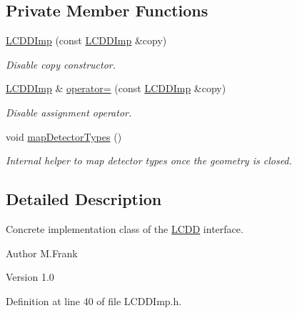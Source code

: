 \subsection*{Private Member Functions}
\begin{DoxyCompactItemize}
\item 
\hyperlink{class_d_d4hep_1_1_geometry_1_1_l_c_d_d_imp_a4c1a7d15bece44b7b5e40e995aecde54}{LCDDImp} (const \hyperlink{class_d_d4hep_1_1_geometry_1_1_l_c_d_d_imp}{LCDDImp} \&copy)
\begin{DoxyCompactList}\small\item\em Disable copy constructor. \item\end{DoxyCompactList}\item 
\hyperlink{class_d_d4hep_1_1_geometry_1_1_l_c_d_d_imp}{LCDDImp} \& \hyperlink{class_d_d4hep_1_1_geometry_1_1_l_c_d_d_imp_a429b6797c934059cab5109ab882f9e81}{operator=} (const \hyperlink{class_d_d4hep_1_1_geometry_1_1_l_c_d_d_imp}{LCDDImp} \&copy)
\begin{DoxyCompactList}\small\item\em Disable assignment operator. \item\end{DoxyCompactList}\item 
void \hyperlink{class_d_d4hep_1_1_geometry_1_1_l_c_d_d_imp_ade5422f804607ee686022a4a05bd3cff}{mapDetectorTypes} ()
\begin{DoxyCompactList}\small\item\em Internal helper to map detector types once the geometry is closed. \item\end{DoxyCompactList}\end{DoxyCompactItemize}


\subsection{Detailed Description}
Concrete implementation class of the \hyperlink{class_d_d4hep_1_1_geometry_1_1_l_c_d_d}{LCDD} interface. \begin{DoxyAuthor}{Author}
M.Frank 
\end{DoxyAuthor}
\begin{DoxyVersion}{Version}
1.0 
\end{DoxyVersion}


Definition at line 40 of file LCDDImp.h.


